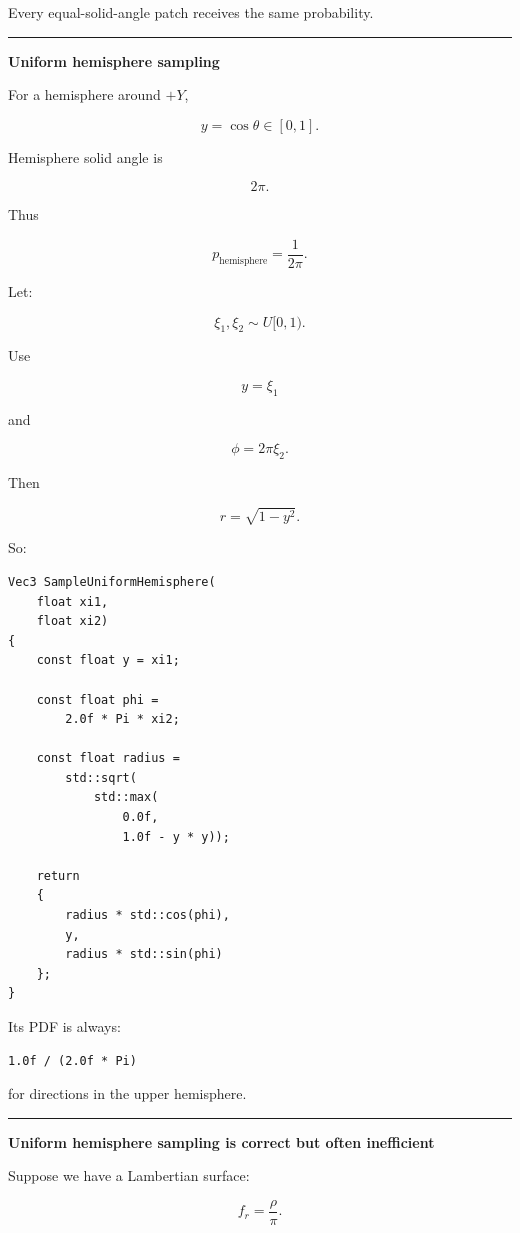 Every equal-solid-angle patch receives the same probability.

\begin{center}\rule{0.5\linewidth}{0.5pt}\end{center}

\textbf{Uniform hemisphere sampling}

For a hemisphere around \(+Y\),

\[
y=\cos\theta\in[0,1].
\]

Hemisphere solid angle is

\[
2\pi.
\]

Thus

\[
\boxed{
p_{\text{hemisphere}}
=
\frac{1}{2\pi}.
}
\]

Let:

\[
\xi_1,\xi_2\sim U[0,1).
\]

Use

\[
\boxed{
y=\xi_1
}
\]

and

\[
\phi=2\pi\xi_2.
\]

Then

\[
r=\sqrt{1-y^2}.
\]

So:

\begin{verbatim}
Vec3 SampleUniformHemisphere(
    float xi1,
    float xi2)
{
    const float y = xi1;

    const float phi =
        2.0f * Pi * xi2;

    const float radius =
        std::sqrt(
            std::max(
                0.0f,
                1.0f - y * y));

    return
    {
        radius * std::cos(phi),
        y,
        radius * std::sin(phi)
    };
}
\end{verbatim}

Its PDF is always:

\begin{verbatim}
1.0f / (2.0f * Pi)
\end{verbatim}

for directions in the upper hemisphere.

\begin{center}\rule{0.5\linewidth}{0.5pt}\end{center}

\textbf{Uniform hemisphere sampling is correct but often inefficient}

Suppose we have a Lambertian surface:

\[
f_r=\frac{\rho}{\pi}.
\]

